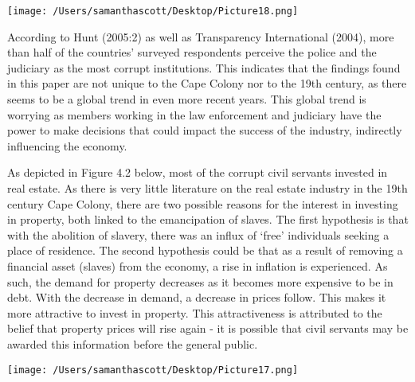 \documentclass[12pt,preprint, authoryear]{elsarticle}
\let\origfigure\figure
\let\endorigfigure\endfigure
\renewenvironment{figure}[1][2] {
    \expandafter\origfigure\expandafter[H]
} {
    \endorigfigure
}
\numberwithin{equation}{section}
\numberwithin{figure}{section}
\numberwithin{table}{section}
\begin{document}
\begin{figure}
\centering
\texttt{[image: /Users/samanthascott/Desktop/Picture18.png]}
\caption{Number of Shares per Office}
\end{figure}

According to Hunt (2005:2) as well as Transparency International (2004),
more than half of the countries' surveyed respondents perceive the
police and the judiciary as the most corrupt institutions. This
indicates that the findings found in this paper are not unique to the
Cape Colony nor to the 19th century, as there seems to be a global trend
in even more recent years. This global trend is worrying as members
working in the law enforcement and judiciary have the power to make
decisions that could impact the success of the industry, indirectly
influencing the economy.

As depicted in Figure 4.2 below, most of the corrupt civil servants
invested in real estate. As there is very little literature on the real
estate industry in the 19th century Cape Colony, there are two possible
reasons for the interest in investing in property, both linked to the
emancipation of slaves. The first hypothesis is that with the abolition
of slavery, there was an influx of `free' individuals seeking a place of
residence. The second hypothesis could be that as a result of removing a
financial asset (slaves) from the economy, a rise in inflation is
experienced. As such, the demand for property decreases as it becomes
more expensive to be in debt. With the decrease in demand, a decrease in
prices follow. This makes it more attractive to invest in property. This
attractiveness is attributed to the belief that property prices will
rise again - it is possible that civil servants may be awarded this
information before the general public.

\begin{figure}
\centering
\texttt{[image: /Users/samanthascott/Desktop/Picture17.png]}
\caption{Number of Shares per Industry}
\end{figure}
\end{document}

